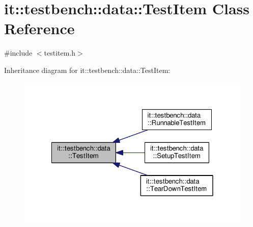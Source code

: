 \hypertarget{classit_1_1testbench_1_1data_1_1TestItem}{\section{it\-:\-:testbench\-:\-:data\-:\-:Test\-Item Class Reference}
\label{df/d1d/classit_1_1testbench_1_1data_1_1TestItem}
}


{\ttfamily \#include $<$testitem.\-h$>$}



Inheritance diagram for it\-:\-:testbench\-:\-:data\-:\-:Test\-Item\-:
\nopagebreak
\begin{figure}[H]
\begin{center}
\leavevmode
\includegraphics[width=320pt]{d9/d9d/classit_1_1testbench_1_1data_1_1TestItem__inherit__graph}
\end{center}
\end{figure}
